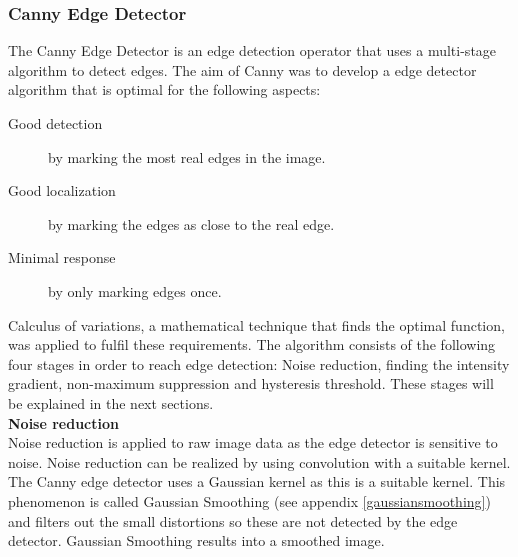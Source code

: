 \documentclass[a4paper]{article}
\begin{document}
\subsubsection{Canny Edge Detector}
The Canny Edge Detector \cite{Canny1986} is an edge detection operator that uses a multi-stage algorithm to detect edges. The aim of Canny was to develop a edge detector algorithm that is optimal for the following aspects:
\begin{description}
\item[Good detection] by marking the most real edges in the image.
\item[Good localization] by marking the edges as close to the real edge.
\item[Minimal response] by only marking edges once.
\end{description}
Calculus of variations, a mathematical technique that finds the optimal function, was applied to fulfil these requirements. The algorithm consists of the following four stages in order to reach edge detection: Noise reduction, finding the intensity gradient, non-maximum suppression and hysteresis threshold. These stages will be explained in the next sections.\\

\noindent\textbf{Noise reduction}\\
Noise reduction is applied to raw image data as the edge detector is sensitive to noise. Noise reduction can be realized by using convolution with a suitable kernel. The Canny edge detector uses a Gaussian kernel as this is a suitable kernel. This phenomenon is called Gaussian Smoothing (see appendix \ref{gaussiansmoothing}) and filters out the small distortions so these are not detected by the edge detector. Gaussian Smoothing results into a smoothed image.\\
\end{document}
